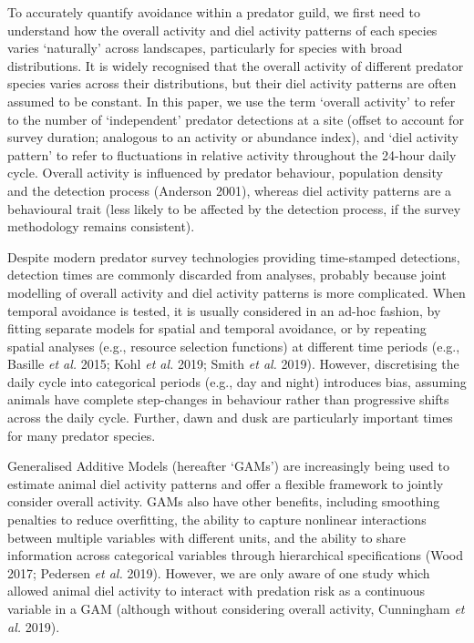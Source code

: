 \documentclass[11pt,a4paper,titlepage,twoside,openright]{style/unimelbthesis}
\begin{document}
\begin{mainmatter}
To accurately quantify avoidance within a predator guild, we first need to understand how the overall activity and diel activity patterns of each species varies `naturally' across landscapes, particularly for species with broad distributions. It is widely recognised that the overall activity of different predator species varies across their distributions, but their diel activity patterns are often assumed to be constant. In this paper, we use the term `overall activity' to refer to the number of `independent' predator detections at a site (offset to account for survey duration; analogous to an activity or abundance index), and `diel activity pattern' to refer to fluctuations in relative activity throughout the 24-hour daily cycle. Overall activity is influenced by predator behaviour, population density and the detection process (Anderson 2001), whereas diel activity patterns are a behavioural trait (less likely to be affected by the detection process, if the survey methodology remains consistent).

Despite modern predator survey technologies providing time-stamped detections, detection times are commonly discarded from analyses, probably because joint modelling of overall activity and diel activity patterns is more complicated. When temporal avoidance is tested, it is usually considered in an ad-hoc fashion, by fitting separate models for spatial and temporal avoidance, or by repeating spatial analyses (e.g., resource selection functions) at different time periods (e.g., Basille \emph{et al.} 2015; Kohl \emph{et al.} 2019; Smith \emph{et al.} 2019). However, discretising the daily cycle into categorical periods (e.g., day and night) introduces bias, assuming animals have complete step-changes in behaviour rather than progressive shifts across the daily cycle. Further, dawn and dusk are particularly important times for many predator species.

Generalised Additive Models (hereafter `GAMs') are increasingly being used to estimate animal diel activity patterns and offer a flexible framework to jointly consider overall activity. GAMs also have other benefits, including smoothing penalties to reduce overfitting, the ability to capture nonlinear interactions between multiple variables with different units, and the ability to share information across categorical variables through hierarchical specifications (Wood 2017; Pedersen \emph{et al.} 2019). However, we are only aware of one study which allowed animal diel activity to interact with predation risk as a continuous variable in a GAM (although without considering overall activity, Cunningham \emph{et al.} 2019).


\end{mainmatter}
\end{document}
